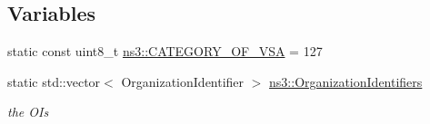 \subsection*{Variables}
\begin{DoxyCompactItemize}
\item 
static const uint8\+\_\+t \hyperlink{namespacens3_aded86438827ae4ff341e6ecb0a5f38b6}{ns3\+::\+C\+A\+T\+E\+G\+O\+R\+Y\+\_\+\+O\+F\+\_\+\+V\+SA} = 127
\item 
static std\+::vector$<$ Organization\+Identifier $>$ \hyperlink{namespacens3_a13607561bb8cb59df7195be69e5a383d}{ns3\+::\+Organization\+Identifiers}
\begin{DoxyCompactList}\small\item\em the O\+Is \end{DoxyCompactList}\end{DoxyCompactItemize}
